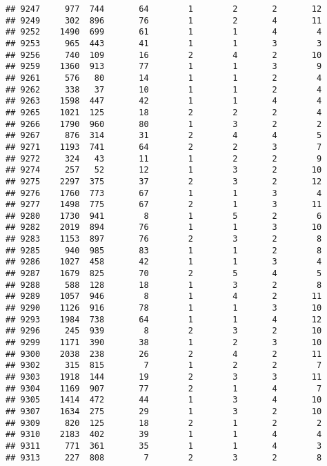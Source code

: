 \documentclass[]{article}
\begin{document}
\begin{verbatim}
## 9247     977  744       64        1        2       2       12
## 9249     302  896       76        1        2       4       11
## 9252    1490  699       61        1        1       4        4
## 9253     965  443       41        1        1       3        3
## 9256     740  109       16        2        4       2       10
## 9259    1360  913       77        1        1       3        9
## 9261     576   80       14        1        1       2        4
## 9262     338   37       10        1        1       2        4
## 9263    1598  447       42        1        1       4        4
## 9265    1021  125       18        2        2       2        4
## 9266    1790  960       80        1        3       2        2
## 9267     876  314       31        2        4       4        5
## 9271    1193  741       64        2        2       3        7
## 9272     324   43       11        1        2       2        9
## 9274     257   52       12        1        3       2       10
## 9275    2297  375       37        2        3       2       12
## 9276    1760  773       67        1        1       3        4
## 9277    1498  775       67        2        1       3       11
## 9280    1730  941        8        1        5       2        6
## 9282    2019  894       76        1        1       3       10
## 9283    1153  897       76        2        3       2        8
## 9285     940  985       83        1        1       2        8
## 9286    1027  458       42        1        1       3        4
## 9287    1679  825       70        2        5       4        5
## 9288     588  128       18        1        3       2        8
## 9289    1057  946        8        1        4       2       11
## 9290    1126  916       78        1        1       3       10
## 9293    1984  738       64        1        1       4       12
## 9296     245  939        8        2        3       2       10
## 9299    1171  390       38        1        2       3       10
## 9300    2038  238       26        2        4       2       11
## 9302     315  815        7        1        2       2        7
## 9303    1918  144       19        2        3       3       11
## 9304    1169  907       77        2        1       4        7
## 9305    1414  472       44        1        3       4       10
## 9307    1634  275       29        1        3       2       10
## 9309     820  125       18        2        1       2        2
## 9310    2183  402       39        1        1       4        4
## 9311     771  361       35        1        1       4        3
## 9313     227  808        7        2        3       2        8

\end{verbatim}
\end{document}
